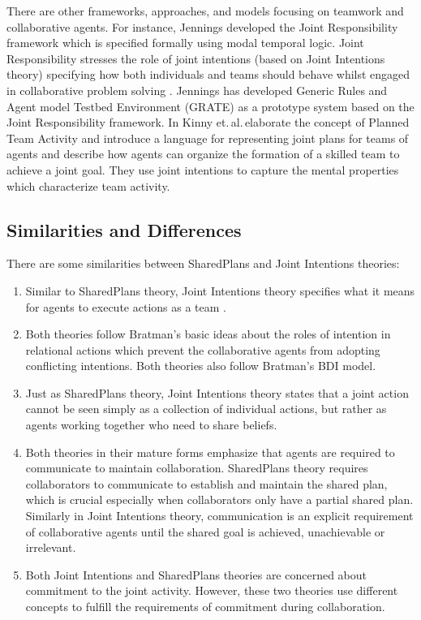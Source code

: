 \documentclass[12pt]{report}
\begin{document}
There are other frameworks, approaches, and models focusing on teamwork and
collaborative agents. For instance, Jennings developed the Joint Responsibility
framework which is specified formally using modal temporal logic. Joint
Responsibility stresses the role of joint intentions (based on Joint Intentions
theory) specifying how both individuals and teams should behave whilst engaged
in collaborative problem solving \cite{jennings:joint-responsibility,
jennings:on-responsible, jennings:joint-intention-hybrid,
jennings:joint-responsibility-dynamic}. Jennings has developed Generic Rules and
Agent model Testbed Environment (GRATE) as a prototype system based on the Joint
Responsibility framework. In \cite{kinny:planned-team} Kinny et.\,al.\,elaborate
the concept of Planned Team Activity and introduce a language for representing
joint plans for teams of agents and describe how agents can organize the
formation of a skilled team to achieve a joint goal. They use joint intentions
to capture the mental properties which characterize team activity.

\subsection{Similarities and Differences}
\label{sec:collaboration-theories-comparison}
There are some similarities between SharedPlans and Joint Intentions theories:

\begin{enumerate}
  \item Similar to SharedPlans theory, Joint Intentions theory specifies what it
  means for agents to execute actions as a team
  \cite{subramanian:joint-intention-dialogue}.
  
  \item Both theories follow Bratman's basic ideas about the roles of intention
  in relational actions which prevent the collaborative agents from adopting
  conflicting intentions. Both theories also follow Bratman's BDI model.
  
  \item Just as SharedPlans theory, Joint Intentions theory states that a
  joint action cannot be seen simply as a collection of individual actions, but
  rather as agents working together who need to share beliefs.
  
  \item Both theories in their mature forms emphasize that agents are required
  to communicate to maintain collaboration. SharedPlans theory requires
  collaborators to communicate to establish and maintain the shared plan, which
  is crucial especially when collaborators only have a partial shared plan.
  Similarly in Joint Intentions theory, communication is an explicit requirement
  of collaborative agents until the shared goal is achieved, unachievable or
  irrelevant.
  
  \item Both Joint Intentions and SharedPlans theories are concerned about
  commitment to the joint activity. However, these two theories use different
  concepts to fulfill the requirements of commitment during collaboration.
\end{enumerate}
\end{document}
